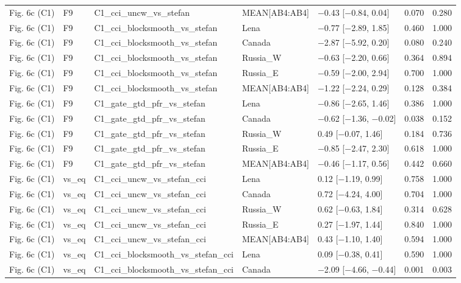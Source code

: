 \begin{longtable}{lllllrr}
Fig. 6c (C1) & F9 & C1\_cci\_uncw\_vs\_stefan & MEAN[AB4:AB4] & $-$0.43 [$-$0.84, 0.04] & 0.070 & 0.280 \\
Fig. 6c (C1) & F9 & C1\_cci\_blocksmooth\_vs\_stefan & Lena & $-$0.77 [$-$2.89, 1.85] & 0.460 & 1.000 \\
Fig. 6c (C1) & F9 & C1\_cci\_blocksmooth\_vs\_stefan & Canada & $-$2.87 [$-$5.92, 0.20] & 0.080 & 0.240 \\
Fig. 6c (C1) & F9 & C1\_cci\_blocksmooth\_vs\_stefan & Russia\_W & $-$0.63 [$-$2.20, 0.66] & 0.364 & 0.894 \\
Fig. 6c (C1) & F9 & C1\_cci\_blocksmooth\_vs\_stefan & Russia\_E & $-$0.59 [$-$2.00, 2.94] & 0.700 & 1.000 \\
Fig. 6c (C1) & F9 & C1\_cci\_blocksmooth\_vs\_stefan & MEAN[AB4:AB4] & $-$1.22 [$-$2.24, 0.29] & 0.128 & 0.384 \\
Fig. 6c (C1) & F9 & C1\_gate\_gtd\_pfr\_vs\_stefan & Lena & $-$0.86 [$-$2.65, 1.46] & 0.386 & 1.000 \\
Fig. 6c (C1) & F9 & C1\_gate\_gtd\_pfr\_vs\_stefan & Canada & $-$0.62 [$-$1.36, $-$0.02] & 0.038 & 0.152 \\
Fig. 6c (C1) & F9 & C1\_gate\_gtd\_pfr\_vs\_stefan & Russia\_W & 0.49 [$-$0.07, 1.46] & 0.184 & 0.736 \\
Fig. 6c (C1) & F9 & C1\_gate\_gtd\_pfr\_vs\_stefan & Russia\_E & $-$0.85 [$-$2.47, 2.30] & 0.618 & 1.000 \\
Fig. 6c (C1) & F9 & C1\_gate\_gtd\_pfr\_vs\_stefan & MEAN[AB4:AB4] & $-$0.46 [$-$1.17, 0.56] & 0.442 & 0.660 \\
Fig. 6c (C1) & vs\_eq & C1\_cci\_uncw\_vs\_stefan\_cci & Lena & 0.12 [$-$1.19, 0.99] & 0.758 & 1.000 \\
Fig. 6c (C1) & vs\_eq & C1\_cci\_uncw\_vs\_stefan\_cci & Canada & 0.72 [$-$4.24, 4.00] & 0.704 & 1.000 \\
Fig. 6c (C1) & vs\_eq & C1\_cci\_uncw\_vs\_stefan\_cci & Russia\_W & 0.62 [$-$0.63, 1.84] & 0.314 & 0.628 \\
Fig. 6c (C1) & vs\_eq & C1\_cci\_uncw\_vs\_stefan\_cci & Russia\_E & 0.27 [$-$1.97, 1.44] & 0.840 & 1.000 \\
Fig. 6c (C1) & vs\_eq & C1\_cci\_uncw\_vs\_stefan\_cci & MEAN[AB4:AB4] & 0.43 [$-$1.10, 1.40] & 0.594 & 1.000 \\
Fig. 6c (C1) & vs\_eq & C1\_cci\_blocksmooth\_vs\_stefan\_cci & Lena & 0.09 [$-$0.38, 0.41] & 0.590 & 1.000 \\
Fig. 6c (C1) & vs\_eq & C1\_cci\_blocksmooth\_vs\_stefan\_cci & Canada & $-$2.09 [$-$4.66, $-$0.44] & 0.001 & 0.003 \\

\end{longtable}
